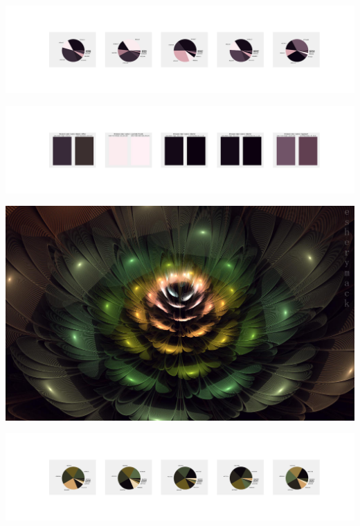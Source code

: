 \documentclass[11pt]{article}
\begin{document}
\begin{landscape}
    \begin{center}
    \includegraphics[width=250mm]{./nbimg/pie-409.jpg}
    \end{center}

    \begin{center}
    \includegraphics[width=250mm]{./nbimg/peak-409.jpg}
    \end{center}
    

    \begin{center}
    \includegraphics[width=\textwidth]{./nbimg/file (62).jpg}
    \end{center}

    \begin{center}
    \includegraphics[width=250mm]{./nbimg/pie-410.jpg}
    \end{center}


\end{landscape}
\end{document}
